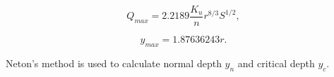 \begin{equation}  
Q_{max} =  2.2189 \frac{K_u}{n} r^{8/3}S^{1/2},
\end{equation}

\begin{equation}  
y_{max}  = 1.87636243 r.
\end{equation}

\noindent Neton's method is used to calculate normal depth $y_n$ and critical depth $y_c$.







